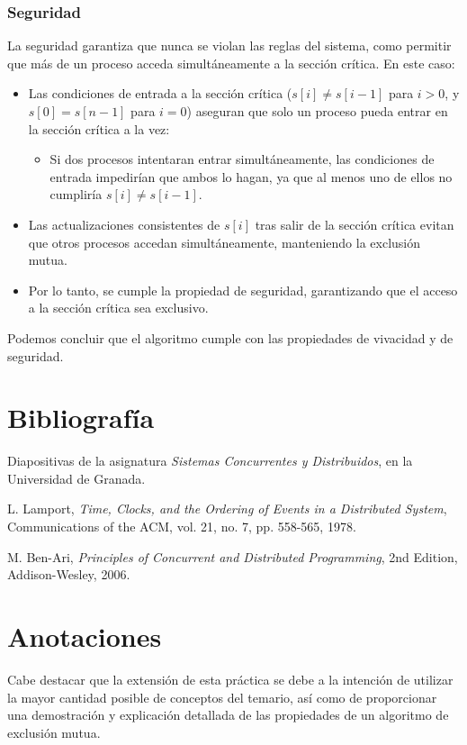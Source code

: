 \documentclass[a4paper,12pt]{article}
\begin{document}
\subsubsection{Seguridad}

La seguridad garantiza que nunca se violan las reglas del sistema, como permitir que más de un proceso acceda simultáneamente a la sección crítica. En este caso:

\begin{itemize}
    \item Las condiciones de entrada a la sección crítica (\( s[i] \neq s[i-1] \) para \( i > 0 \), y \( s[0] = s[n-1] \) para \( i = 0 \)) aseguran que solo un proceso pueda entrar en la sección crítica a la vez:
    \begin{itemize}
        \item Si dos procesos intentaran entrar simultáneamente, las condiciones de entrada impedirían que ambos lo hagan, ya que al menos uno de ellos no cumpliría \( s[i] \neq s[i-1] \).
    \end{itemize}
    \item Las actualizaciones consistentes de \( s[i] \) tras salir de la sección crítica evitan que otros procesos accedan simultáneamente, manteniendo la exclusión mutua.
    \item Por lo tanto, se cumple la propiedad de seguridad, garantizando que el acceso a la sección crítica sea exclusivo.
\end{itemize}

Podemos concluir que el algoritmo cumple con las propiedades de vivacidad y de seguridad.

\section{Bibliografía}

\begin{thebibliography}{9}

Diapositivas de la asignatura \textit{Sistemas Concurrentes y Distribuidos}, en la Universidad de Granada.


L. Lamport, 
\textit{Time, Clocks, and the Ordering of Events in a Distributed System}, 
Communications of the ACM, vol. 21, no. 7, pp. 558-565, 1978.

M. Ben-Ari, 
\textit{Principles of Concurrent and Distributed Programming}, 
2nd Edition, Addison-Wesley, 2006.

\end{thebibliography}

\section{Anotaciones}

Cabe destacar que la extensión de esta práctica se debe a la intención de utilizar la mayor cantidad posible de conceptos del temario, así como de proporcionar una demostración y explicación detallada de las propiedades de un algoritmo de exclusión mutua.
\end{document}
